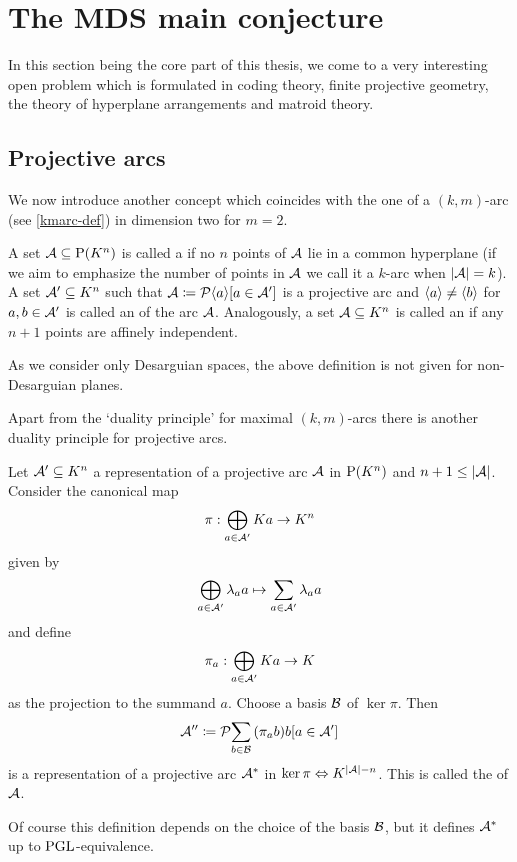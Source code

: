 \section{The MDS main conjecture}\label{sec-mds-connections}

In this section being the core part of this thesis, we come to a very interesting open problem which is formulated in coding theory, finite projective geometry, the theory of hyperplane arrangements and matroid theory.

\subsection{Projective arcs}

We now introduce another concept which coincides with the one of a $(k,m)$-arc (see \autoref{kmarc-def}) in dimension two for $m=2$.

\begin{definition}
    A set $\cA\setleq \P(K^n)$ is called a  if no $n$ points of $\mathcal{A}$ lie in a common hyperplane (if we aim to emphasize the number of points in $\mathcal{A}$ we call it a $k$-arc when $\left|\mathcal{A}\right|=k$).
    A set $\mathcal{A}'\subseteq K^n$ such that $\cA\defeq\set{\gen a}[a\in\cA']$ is a projective arc and $\gen a\neq\gen b$ for $a,b\in\mathcal{A}'$ is called an  of the arc $\mathcal{A}$.
    Analogously, a set $\mathcal{A}\subseteq K^n$ is called an  if any $n+1$ points are affinely independent.
\end{definition}

\begin{remark}
    As we consider only Desarguian spaces, the above definition is not given for non-Desarguian planes.
\end{remark}

Apart from the `duality principle' for maximal $(k,m)$-arcs there is another duality principle for projective arcs.

\begin{definition}\label{def-dual-arc}
    Let $\mathcal{A}'\subseteq K^n$ a representation of a projective arc $\mathcal{A}$ in $\P(K^n)$ and $n+1\leq \left|\mathcal{A}\right|$. Consider the canonical map
    $$\pi:\bigoplus_{a\in\mathcal{A}'}{Ka}\rightarrow K^n$$
    given by
    $$\bigoplus_{a\in\mathcal{A}'}{\lambda_a a}\mapsto \sum_{a\in\mathcal{A}'}{\lambda_a a}$$
    and define
    $$\pi_a:\bigoplus_{a\in \mathcal{A}'}{Ka}\rightarrow K$$
    as the projection to the summand $a$.
    Choose a basis $\mathcal{B}$ of $\ker \pi$. Then
    $$
    \cA''\defeq\set{\sum_{b\in\cB}{(\pi_a b)b}}[a\in\cA']
    $$
    is a representation of a projective arc $\mathcal{A}^{\ast}$ in $\ker \pi \iso K^{\card\cA -n}$.
    This is called the  of $\mathcal{A}$.
\end{definition}
\begin{remark}
Of course this definition depends on the choice of the basis $\mathcal{B}$, but it defines $\mathcal{A}^{\ast}$ up to $\mathrm{PGL}$-equivalence.
\end{remark}

